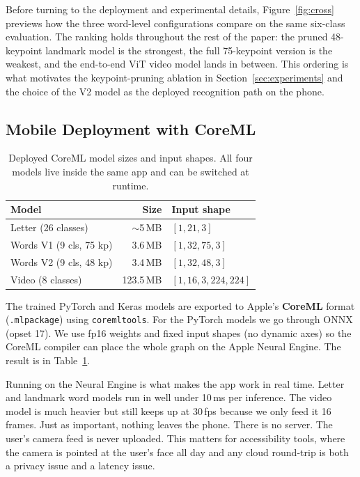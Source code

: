 \documentclass[11pt]{article}
\begin{document}
Before turning to the deployment and experimental details, Figure~\ref{fig:cross} previews how the three word-level configurations compare on the same six-class evaluation. The ranking holds throughout the rest of the paper: the pruned 48-keypoint landmark model is the strongest, the full 75-keypoint version is the weakest, and the end-to-end ViT video model lands in between. This ordering is what motivates the keypoint-pruning ablation in Section~\ref{sec:experiments} and the choice of the V2 model as the deployed recognition path on the phone.

\subsection{Mobile Deployment with CoreML}

\begin{table}[t]
\centering
\small
\begin{tabular}{lrl}
\toprule
Model & Size & Input shape \\
\midrule
Letter (26 classes)      & $\sim$5\,MB  & $[1, 21, 3]$ \\
Words V1 (9 cls, 75 kp) & 3.6\,MB & $[1, 32, 75, 3]$ \\
Words V2 (9 cls, 48 kp) & 3.4\,MB & $[1, 32, 48, 3]$ \\
Video (8 classes)        & 123.5\,MB & $[1, 16, 3, 224, 224]$ \\
\bottomrule
\end{tabular}
\caption{Deployed CoreML model sizes and input shapes. All four models live inside the same app and can be switched at runtime.}
\label{tab:coreml}
\end{table}

The trained PyTorch and Keras models are exported to Apple's \textbf{CoreML} format (\texttt{.mlpackage}) using \texttt{coremltools}. For the PyTorch models we go through ONNX (opset 17). We use fp16 weights and fixed input shapes (no dynamic axes) so the CoreML compiler can place the whole graph on the Apple Neural Engine. The result is in Table~\ref{tab:coreml}.

Running on the Neural Engine is what makes the app work in real time. Letter and landmark word models run in well under 10\,ms per inference. The video model is much heavier but still keeps up at 30\,fps because we only feed it 16 frames. Just as important, nothing leaves the phone. There is no server. The user's camera feed is never uploaded. This matters for accessibility tools, where the camera is pointed at the user's face all day and any cloud round-trip is both a privacy issue and a latency issue.
\end{document}
